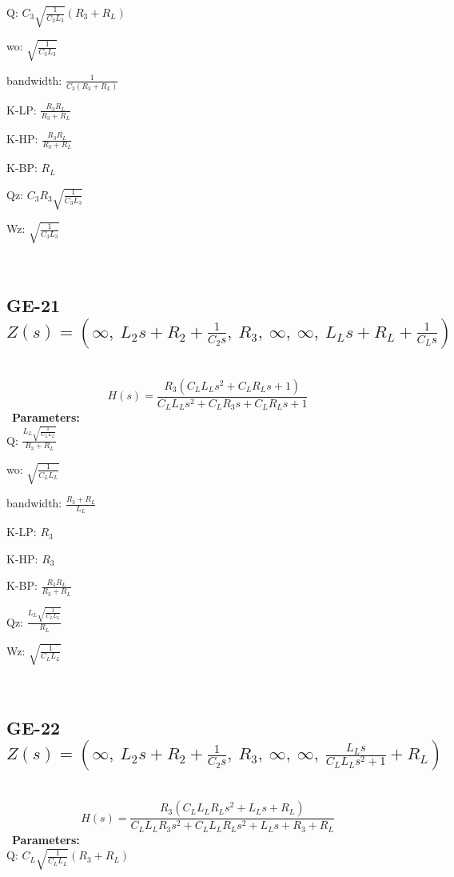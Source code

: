 \documentclass{article}
\begin{document}
Q: $C_{3} \sqrt{\frac{1}{C_{3} L_{3}}} \left(R_{3} + R_{L}\right)$\ 

wo: $\sqrt{\frac{1}{C_{3} L_{3}}}$\ 

bandwidth: $\frac{1}{C_{3} \left(R_{3} + R_{L}\right)}$\ 

K-LP: $\frac{R_{3} R_{L}}{R_{3} + R_{L}}$\ 

K-HP: $\frac{R_{3} R_{L}}{R_{3} + R_{L}}$\ 

K-BP: $R_{L}$\ 

Qz: $C_{3} R_{3} \sqrt{\frac{1}{C_{3} L_{3}}}$\ 

Wz: $\sqrt{\frac{1}{C_{3} L_{3}}}$\ 

\ 

\subsection{GE-21 $Z(s) = \left( \infty, \  L_{2} s + R_{2} + \frac{1}{C_{2} s}, \  R_{3}, \  \infty, \  \infty, \  L_{L} s + R_{L} + \frac{1}{C_{L} s}\right)$ } \ 
\textbf{\[H(s) = \frac{R_{3} \left(C_{L} L_{L} s^{2} + C_{L} R_{L} s + 1\right)}{C_{L} L_{L} s^{2} + C_{L} R_{3} s + C_{L} R_{L} s + 1}\] } \ 
\textbf{Parameters:}\\ 

Q: $\frac{L_{L} \sqrt{\frac{1}{C_{L} L_{L}}}}{R_{3} + R_{L}}$\ 

wo: $\sqrt{\frac{1}{C_{L} L_{L}}}$\ 

bandwidth: $\frac{R_{3} + R_{L}}{L_{L}}$\ 

K-LP: $R_{3}$\ 

K-HP: $R_{3}$\ 

K-BP: $\frac{R_{3} R_{L}}{R_{3} + R_{L}}$\ 

Qz: $\frac{L_{L} \sqrt{\frac{1}{C_{L} L_{L}}}}{R_{L}}$\ 

Wz: $\sqrt{\frac{1}{C_{L} L_{L}}}$\ 

\ 

\subsection{GE-22 $Z(s) = \left( \infty, \  L_{2} s + R_{2} + \frac{1}{C_{2} s}, \  R_{3}, \  \infty, \  \infty, \  \frac{L_{L} s}{C_{L} L_{L} s^{2} + 1} + R_{L}\right)$ } \ 
\textbf{\[H(s) = \frac{R_{3} \left(C_{L} L_{L} R_{L} s^{2} + L_{L} s + R_{L}\right)}{C_{L} L_{L} R_{3} s^{2} + C_{L} L_{L} R_{L} s^{2} + L_{L} s + R_{3} + R_{L}}\] } \ 
\textbf{Parameters:}\\ 

Q: $C_{L} \sqrt{\frac{1}{C_{L} L_{L}}} \left(R_{3} + R_{L}\right)$\ 
\end{document}
